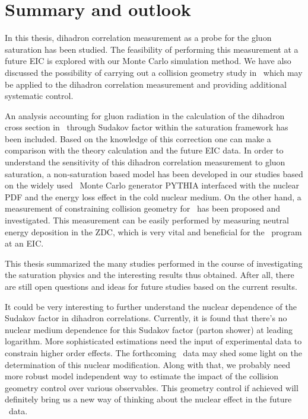 \chapter{Summary and outlook} \label{chp:summary}

In this thesis, dihadron correlation measurement as a probe for the gluon 
saturation has been studied. The feasibility of performing this measurement at a
future EIC is explored with our Monte Carlo simulation method. We have also
discussed the possibility of carrying out a collision geometry study in \eA\,
which may be applied to the dihadron correlation measurement and providing
additional systematic control.

An analysis accounting for gluon radiation in the calculation of the dihadron
cross section in \eA\ through Sudakov factor within the saturation framework has
been included. Based on the knowledge of this correction one can make a
comparison with the theory calculation and the future EIC data. In order to
understand the sensitivity of this dihadron correlation measurement to gluon
saturation, a non-saturation based model has been developed in our studies based
on the widely used \ep\ Monte Carlo generator PYTHIA interfaced with the nuclear
PDF and the energy loss effect in the cold nuclear medium. On the other hand, a
measurement of constraining collision geometry for \eA\ has been proposed and
investigated. This measurement can be easily performed by measuring neutral
energy deposition in the ZDC, which is very vital and beneficial for the \eA\ program at an EIC. 

This thesis summarized the many studies performed in the course of investigating
the saturation physics and the interesting results thus obtained. After all, there
are still open questions and ideas for future studies based on the current
results.

It could be very interesting to further understand the nuclear dependence of the
Sudakov factor in dihadron correlations. Currently, it is found that there's no
nuclear medium dependence for this Sudakov factor (parton shower) at leading
logarithm. More sophisticated estimations need the input of experimental data to
constrain higher order effects. The forthcoming \pA\ data may shed some light on
the determination of this nuclear modification. Along with that, we probably
need more robust model independent way to estimate the impact of the collision
geometry control over various observables. This geometry control if achieved
will definitely bring us a new way of thinking about the nuclear effect in the
future \eA\ data.
